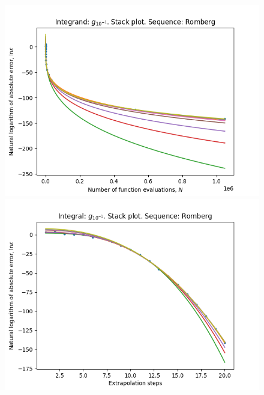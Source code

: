 \begin{figure}[H]
\centering
\begin{minipage}{0.45\textwidth}
\centering
\includegraphics[scale=0.45]{../results/romberg_plots/g_tenth_hp_romberg_stack.png}
\end{minipage}
\begin{minipage}{0.45\textwidth}
\centering
\includegraphics[scale=0.45]{../results/romberg_plots/g_tenth_hp_romberg_steps_stack.png}
\end{minipage}
\end{figure}

